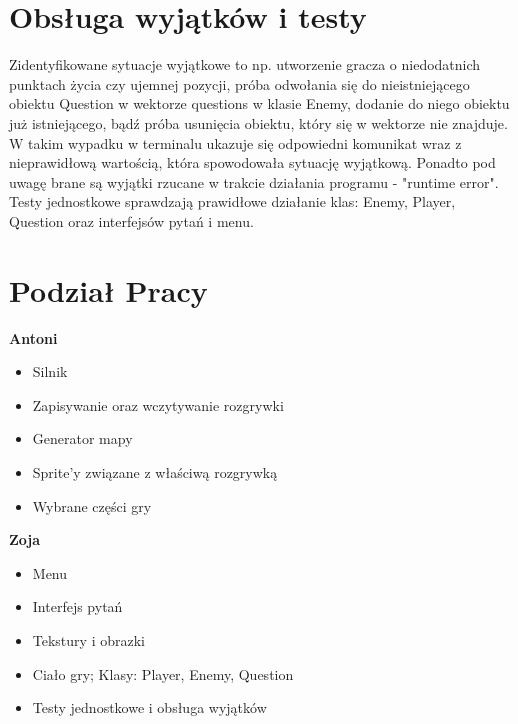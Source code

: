 \documentclass[12pt, titlepage]{article}
\begin{document}
\section{Obsługa wyjątków i testy}
Zidentyfikowane sytuacje wyjątkowe to np. utworzenie gracza o niedodatnich punktach życia czy ujemnej pozycji, próba odwołania się do nieistniejącego obiektu Question w wektorze questions w klasie Enemy, dodanie do niego obiektu już istniejącego, bądź próba usunięcia obiektu, który się w wektorze nie znajduje. W takim wypadku w terminalu ukazuje się odpowiedni komunikat wraz z nieprawidłową wartością, która spowodowała sytuację wyjątkową. Ponadto pod uwagę brane są wyjątki rzucane w trakcie działania programu - "runtime error".
Testy jednostkowe sprawdzają prawidłowe działanie klas: Enemy, Player, Question oraz interfejsów pytań i menu.


\section{Podział Pracy}
\textbf{Antoni}
\begin{itemize}
	\item Silnik
        \item Zapisywanie oraz wczytywanie rozgrywki
        \item Generator mapy
        \item Sprite'y związane z właściwą rozgrywką
	\item Wybrane części gry
\end{itemize}
 
\noindent
\textbf{Zoja}
\begin{itemize}
	\item Menu
	\item Interfejs pytań
	\item Tekstury i obrazki
	\item Ciało gry; Klasy: Player, Enemy, Question
        \item Testy jednostkowe i obsługa wyjątków
\end{itemize}
\end{document}
